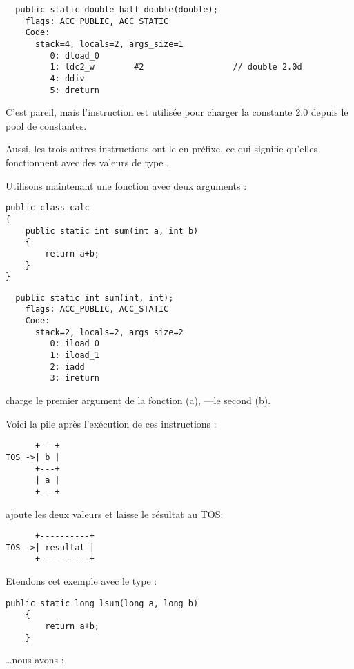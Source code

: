 \begin{lstlisting}
  public static double half_double(double);
    flags: ACC_PUBLIC, ACC_STATIC
    Code:
      stack=4, locals=2, args_size=1
         0: dload_0       
         1: ldc2_w        #2                  // double 2.0d
         4: ddiv          
         5: dreturn       
\end{lstlisting}

C'est pareil, mais l'instruction  est utilisée pour charger la constante
2.0 depuis le pool de constantes.

Aussi, les trois autres instructions ont le  en préfixe,
ce qui signifie qu'elles fonctionnent avec des valeurs de type .


Utilisons maintenant une fonction avec deux arguments :

\begin{lstlisting}[style=customjava]
public class calc
{
	public static int sum(int a, int b)
	{
		return a+b;
	}
}
\end{lstlisting}

\begin{lstlisting}
  public static int sum(int, int);
    flags: ACC_PUBLIC, ACC_STATIC
    Code:
      stack=2, locals=2, args_size=2
         0: iload_0       
         1: iload_1       
         2: iadd          
         3: ireturn       
\end{lstlisting}

 charge le premier argument de la fonction (a), ---le second (b).

Voici la pile après l'exécution de ces instructions :

\begin{lstlisting}
      +---+
TOS ->| b |
      +---+
      | a |
      +---+
\end{lstlisting}

 ajoute les deux valeurs et laisse le résultat au \ac{TOS}:


\begin{lstlisting}
      +----------+
TOS ->| resultat |
      +----------+
\end{lstlisting}

Etendons cet exemple avec le type  :


\begin{lstlisting}[style=customjava]
	public static long lsum(long a, long b)
	{
		return a+b;
	}
\end{lstlisting}

\dots nous avons :

